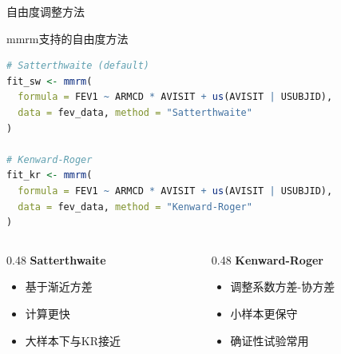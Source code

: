 \documentclass[aspectratio=169,11pt]{beamer}
\begin{document}
\begin{frame}[fragile]{自由度调整方法}
\begin{block}{mmrm支持的自由度方法}
\begin{lstlisting}[language=R,basicstyle=\ttfamily\scriptsize]
# Satterthwaite (default)
fit_sw <- mmrm(
  formula = FEV1 ~ ARMCD * AVISIT + us(AVISIT | USUBJID),
  data = fev_data, method = "Satterthwaite"
)

# Kenward-Roger
fit_kr <- mmrm(
  formula = FEV1 ~ ARMCD * AVISIT + us(AVISIT | USUBJID),
  data = fev_data, method = "Kenward-Roger"
)
\end{lstlisting}
\end{block}

\vspace{0.1cm}
\begin{columns}[T,totalwidth=\textwidth]
\begin{column}{0.48\textwidth}
\textbf{Satterthwaite}
\begin{itemize}
    \item 基于渐近方差
    \item 计算更快
    \item 大样本下与KR接近
\end{itemize}
\end{column}
\begin{column}{0.48\textwidth}
\textbf{Kenward-Roger}
\begin{itemize}
    \item 调整系数方差-协方差
    \item 小样本更保守
    \item 确证性试验常用
\end{itemize}
\end{column}
\end{columns}
\end{frame}
\end{document}

